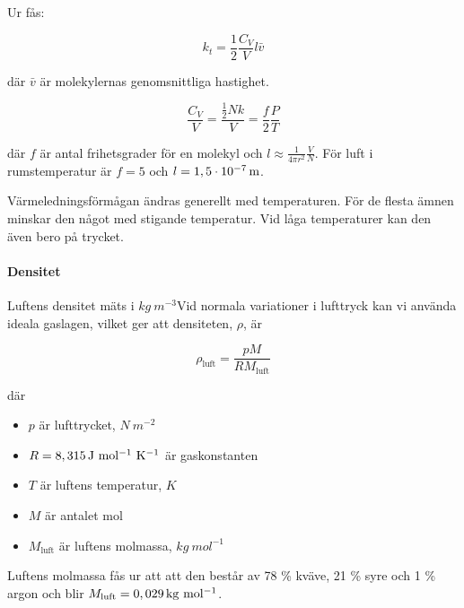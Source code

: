 Ur \cite[ss.~41-42]{schroeder00} fås:

\begin{equation}
\label{eq:natconst:schroeder1}
k_t=\frac{1}{2}\frac{C_V}{V} l \bar{v}
\end{equation}

där $\bar{v}$ är molekylernas genomsnittliga hastighet.

\begin{equation}
\label{eq:natconst:schroeder2}
\frac{C_V}{V}=\frac{\tfrac{1}{2}Nk}{V}=\frac{f}{2}\frac{P}{T}
\end{equation}

där $f$ är antal frihetsgrader för en molekyl och $l\approx\frac{1}{4\pi r^2}\frac{V}{N}$. För luft i rumstemperatur är $f=5$ och $l=\unit[1,5\cdot 10^{-7}]{m}$.

Värmeledningsförmågan ändras generellt med temperaturen. För de flesta ämnen minskar den något med stigande temperatur. Vid låga temperaturer kan den även bero på trycket. 



\paragraph{Densitet} %
\label{sec:densitet}

Luftens densitet mäts i $\unit{kg~m^{-3}}$Vid normala variationer i lufttryck kan vi använda ideala gaslagen, vilket ger att densiteten, $\rho$, är

\begin{equation}
\rho_\text{luft}=\frac{p M}{R M_\text{luft}}
\end{equation}

där
\begin{itemize}
   \item[] $p$ är lufttrycket, $\unit{N~m^{-2}}$
   \item[] $R=\unit[8,315]{J~mol^{-1}~K^{-1}}$ är gaskonstanten
   \item[] $T$ är luftens temperatur, $\unit{K}$
   \item[] $M$ är antalet mol
   \item[] $M_\text{luft}$ är luftens molmassa, $\unit{kg~mol^{-1}}$
\end{itemize}

Luftens molmassa fås ur att att den består av 78 \% kväve, 21 \% syre och 1 \% argon och blir $M_\text{luft}=\unit[0,029]{kg~mol^{-1}}$.

